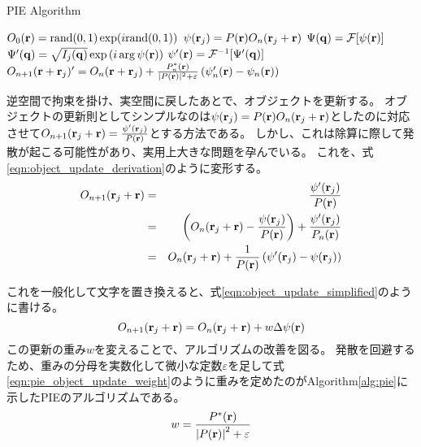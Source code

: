 \begin{algorithm}                      
\caption{PIE Algorithm}         
\label{alg:pie}                          
\begin{algorithmic}
    \STATE $O_0(\mathbf{r}) = \mathrm{rand}(0,1) \exp(i \mathrm{rand}(0,1) )$
        \STATE $\psi(\mathbf{r}_j) = P(\mathbf{r}) O_n(\mathbf{r}_j + \mathbf{r})$
        \STATE $\Psi(\mathbf{q}) = \mathcal F [\psi(\mathbf{r})]$
        \STATE $\Psi'(\mathbf{q}) = \sqrt{I_j(\mathbf{q})} \exp\left( i \arg \psi(\mathbf{r}) \right)$ 
        \STATE $\psi'(\mathbf{r}) = \mathcal F^{-1} [\Psi'(\mathbf{q})]$
        \STATE $O_{n+1}(\mathbf{r} + \mathbf{r}_j)'
          = O_n(\mathbf{r} + \mathbf{r}_j) 
          + \frac{P_n^*(\mathbf{r})}{|P(\mathbf{r})|^2+\varepsilon} \left( \psi_n'(\mathbf{r}) - \psi_n(\mathbf{r}) \right)$
      \ENDFOR
    \ENDFOR
\end{algorithmic}
\end{algorithm}

逆空間で拘束を掛け、実空間に戻したあとで、オブジェクトを更新する。
オブジェクトの更新則としてシンプルなのは$\psi(\mathbf{r}_j) = P(\mathbf{r}) O_n(\mathbf{r}_j + \mathbf{r})$としたのに対応させて$O_{n+1}(\mathbf{r}_j + \mathbf{r}) = \frac{\psi'(\mathbf{r}_j)}{P(\mathbf{r})}$とする方法である。
しかし、これは除算に際して発散が起こる可能性があり、実用上大きな問題を孕んでいる。
これを、式\ref{eqn:object_update_derivation}のように変形する。
\begin{eqnarray}
O_{n+1}(\mathbf{r}_j + \mathbf{r})
  &=& \frac{\psi'(\mathbf{r}_j)}{P(\mathbf{r})} \nonumber \\
  &=& \left( O_n(\mathbf{r}_j + \mathbf{r}) - \frac{\psi(\mathbf{r}_j)}{P(\mathbf{r})} \right) + \frac{\psi'(\mathbf{r}_j)}{P_n(\mathbf{r})} \nonumber \\
  &=& O_n(\mathbf{r}_j + \mathbf{r}) + \frac{1}{P(\mathbf{r})} \left( \psi'(\mathbf{r}_j) - \psi(\mathbf{r}_j) \right) \label{eqn:object_update_derivation}
\end{eqnarray}

これを一般化して文字を置き換えると、式\ref{eqn:object_update_simplified}のように書ける。
\begin{equation}
\label{eqn:object_update_simplified}
  O_{n+1}(\mathbf{r}_j + \mathbf{r}) = O_n(\mathbf{r}_j + \mathbf{r}) + w \Delta\psi(\mathbf{r})
\end{equation}
この更新の重み$w$を変えることで、アルゴリズムの改善を図る。
発散を回避するため、重みの分母を実数化して微小な定数$\varepsilon$を足して式\ref{eqn:pie_object_update_weight}のように重みを定めたのがAlgorithm\ref{alg:pie}に示したPIEのアルゴリズムである。
\begin{equation}
  \label{eqn:pie_object_update_weight}
  w = \frac{P^*(\mathbf{r})}{\left| P(\mathbf{r}) \right|^2 + \varepsilon}
\end{equation}


